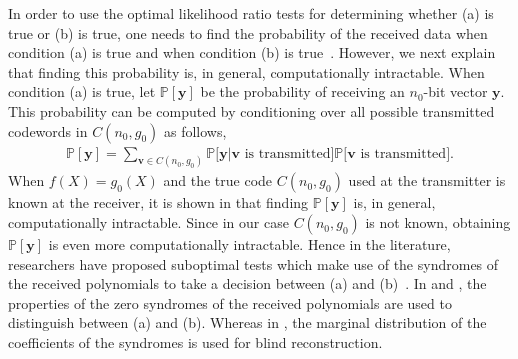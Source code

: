 \documentclass[10pt,journal]{IEEEtran}
\begin{document}
In order to use the optimal likelihood ratio tests for determining whether (a) is true or (b) is true, one needs to 
find the probability of the received data when condition (a) is true and when condition (b) is true~\cite{Poor94}.
However, we next explain that finding this probability is, in general, computationally intractable.
When condition (a) is true, let $\mathbb{P}[\mathbf{y}]$ be the probability of receiving an $n_0$-bit vector $\mathbf{y}$.
This probability can be computed by conditioning over all possible transmitted codewords in $C(n_0,g_0)$ as follows,
% 
\begin{align*}
%  
\mathbb{P}[\mathbf{y}] = \sum_{\mathbf{v} \in C(n_0,g_0)} \mathbb{P}\Big[\mathbf{y} \Big| \mathbf{v} \mbox{ is transmitted}\Big]\mathbb{P}\Big[\mathbf{v} \mbox{ is transmitted}\Big].
% 
\end{align*}
% 
When $f(X)=g_0(X)$ and the true code $C(n_0,g_0)$ used at the transmitter is known at the receiver, it is shown in \cite{ISIT2014} that
finding $\mathbb{P}[\mathbf{y}]$ is, in general, computationally intractable.
% 
Since in our case $C(n_0,g_0)$ is not known, obtaining $\mathbb{P}[\mathbf{y}]$ is even more computationally 
intractable.
% 
Hence in the literature, researchers have proposed suboptimal tests which make use of the syndromes of the received polynomials 
to take a decision between (a) and (b)~\cite{TCOMM_2016, Zhou2013_Entropy_new, Zhou2013_Entropy}.
% 
In \cite{TCOMM_2016} and \cite{Zhou2013_Entropy}, the properties of the zero syndromes of the received polynomials are used
to distinguish between (a) and (b). Whereas in \cite{Zhou2013_Entropy_new}, the marginal distribution of
the coefficients of the syndromes is used for blind reconstruction.
\end{document}
